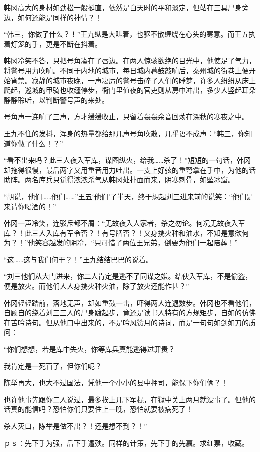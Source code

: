 韩冈高大的身材如劲松一般挺直，依然是白天时的平和淡定，但站在三具尸身旁边，如何还能是同样的神情？！

“韩三，你做了什么？！”王九纵是大叫着，也驱不散缠绕在心头的寒意。而王五执着灯笼的手，更是不断在抖着。

韩冈冷笑不答，只把号角凑在了唇边。在两人惊骇欲绝的目光中，他使足了气力，将警号用力吹响。不同于内地的城市，每日城内暮鼓敲响后，秦州城的街巷上便开始宵禁。寂静的城市夜晚，一声凄厉的警号击碎了人们的睡梦，许多人纷纷从床上爬起，巡城的甲骑也收缰停步，衙门里值夜的官吏则从房中冲出，多少人竖起耳朵静静聆听，以判断警号声的来处。

号角声一连响了三声，方才缓缓收止，只留着袅袅余音回荡在深秋的寒夜之中。

王九不住的发抖，浑身的热量都给那几声号角吹散，几乎语不成声：“韩三，你知道你做了什么！？”

“看不出来吗？此三人夜入军库，谋图纵火，给我……杀了！”短短的一句话，韩冈却拖得很慢，最后两字又用重音用力吐出。一支上好弦的重弩拿在手中，为他的话助阵。两名库兵只觉得浓浓杀气从韩冈处扑面而来，阴寒刺骨，如坠冰窟。

“胡说，他们……他们……”王五‘他们’了半天，终于想起刘三进来前的说笑：“他们是来请你喝酒的！”

韩冈一声冷笑，连驳斥都不屑：“无故夜入人家者，杀之勿论。何况无故夜入军库？！此三人入库有军令否？！有号牌否？！又身携火种和油水，不知是意欲何为？！”他笑容越发的阴冷，“只可惜了两位王兄弟，倒要为他们一起陪葬！”

“这……这与我们何干？！”王九结结巴巴的说着。

“刘三他们从大门进来，你二人肯定是逃不了同谋之嫌。结伙入军库，不是偷盗，便是放火。而他们人人身携火种火油，除了放火还能作甚？”

韩冈轻轻踏前，落地无声，却如重鼓一击，吓得两人连退数步。韩冈也不看他们，自顾自的绕着刘三三人的尸身踱起步，竟还是读书人特有的方规矩步，自如的仿佛在苦吟诗句。但从他口中出来的，不是吟风赞月的诗词，而是一句句如剑如刀的质问：

“你们想想，若是库中失火，你等库兵真能逃得过罪责？

我肯定是一死百了，但你们呢？

陈举再大，也大不过国法，凭他一个小小的县中押司，能保下你们俩？！

也许他事先跟你二人说过，最多挨上几下军棍，在狱中关上两月就没事了。但他的话真的能信吗？恐怕你们只要住上一晚，恐怕就要被病死了！

杀人灭口，陈举是做不出？！还是想不到？！”

ｐｓ：先下手为强，后下手遭殃。同样的计策，先下手的先赢。求红票，收藏。

